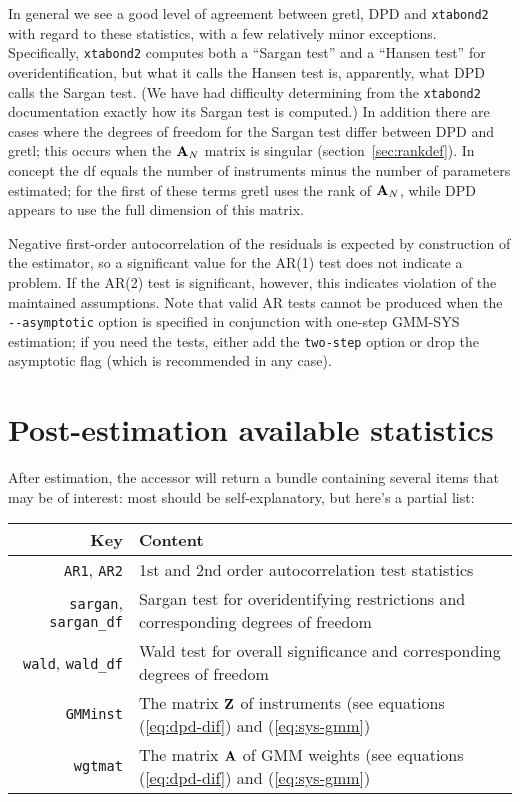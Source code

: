 In general we see a good level of agreement between gretl, DPD and
\texttt{xtabond2} with regard to these statistics, with a few
relatively minor exceptions. Specifically, \texttt{xtabond2} computes
both a ``Sargan test'' and a ``Hansen test'' for overidentification,
but what it calls the Hansen test is, apparently, what DPD calls the
Sargan test. (We have had difficulty determining from the
\texttt{xtabond2} documentation \citep{Roodman2006} exactly how its
Sargan test is computed.) In addition there are cases where the
degrees of freedom for the Sargan test differ between DPD and gretl;
this occurs when the $\mathbf{A}_N$ matrix is singular
(section~\ref{sec:rankdef}). In concept the df equals the number of
instruments minus the number of parameters estimated; for the first of
these terms gretl uses the rank of $\mathbf{A}_N$, while DPD appears to use
the full dimension of this matrix.

Negative first-order autocorrelation of the residuals is expected by
construction of the estimator, so a significant value for the AR(1)
test does not indicate a problem. If the AR(2) test is significant,
however, this indicates violation of the maintained assumptions. Note
that valid AR tests cannot be produced when the \verb|--asymptotic|
option is specified in conjunction with one-step GMM-SYS estimation;
if you need the tests, either add the \verb|two-step| option or drop
the asymptotic flag (which is recommended in any case).

\section{Post-estimation available statistics}
\label{sec:dpanel-post}

After estimation, the  accessor will return a bundle
containing several items that may be of interest: most should be
self-explanatory, but here's a partial list:

\begin{center}
\begin{tabular}{rp{}}
  \hline
  \textbf{Key} & \textbf{Content} \\
  \hline
  \texttt{AR1}, \texttt{AR2} & 1st and 2nd order autocorrelation test
                               statistics \\
  \texttt{sargan}, \texttt{sargan\_df} & Sargan test for
                                         overidentifying restrictions
                                         and corresponding degrees of freedom \\
  \texttt{wald}, \texttt{wald\_df} & Wald test for
                                     overall significance
                                     and corresponding degrees of
                                     freedom \\
  \texttt{GMMinst} & The matrix $\mathbf{Z}$ of instruments (see equations
                     (\ref{eq:dpd-dif}) and (\ref{eq:sys-gmm}) \\
  \texttt{wgtmat} & The matrix $\mathbf{A}$ of GMM weights (see equations
                    (\ref{eq:dpd-dif}) and (\ref{eq:sys-gmm}) \\
  \hline
\end{tabular}
\end{center}

